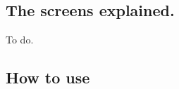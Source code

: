 \chapter{\CC}\label{CncCalculator}

\section{The screens explained.}
To do.

\section{How to use \CC}
